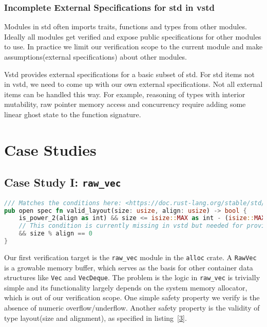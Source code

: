 \documentclass[conference]{IEEEtran}
\begin{document}
\subsubsection{Incomplete External Specifications for std in vstd}
Modules in std often imports traits, functions and types from other modules. Ideally all modules get verified and expose public specifications for other modules to use. In practice we limit our verification scope to the current module and make assumptions(external specifications) about other modules. 

Vstd provides external specifications for a basic subset of std. For std items not in vstd, we need to come up with our own external specifications. Not all external items can be handled this way. For example, reasoning of types with interior mutability, raw pointer memory access and concurrency require adding some linear ghost state to the function signature.   

\section{Case Studies}
\subsection{Case Study I: \texttt{raw\_vec}}
\begin{lstlisting}[language=Rust,style=colouredRust, caption={The formal specification of a valid layout in vstd}, label = {3}]
/// Matches the conditions here: <https://doc.rust-lang.org/stable/std/alloc/struct.Layout.html>
pub open spec fn valid_layout(size: usize, align: usize) -> bool {
    is_power_2(align as int) && size <= isize::MAX as int - (isize::MAX as int % align as int)
    // This condition is currently missing in vstd but needed for proving pointer arithmics. See <https://github.com/verus-lang/verus/issues/1570>.
    && size % align == 0 
}
\end{lstlisting}
Our first verification target is the \texttt{raw\_vec} module in the \texttt{alloc} crate. A \texttt{RawVec} is a growable memory buffer, which serves as the basis for other container data structures like \texttt{Vec} and \texttt{VecDeque}. The problem is the logic in \texttt{raw\_vec} is trivially simple and its functionality largely depends on the system memory allocator, which is out of our verification scope. One simple safety property we verify is the absence of numeric overflow/underflow. Another safety property is the validity of type layout(size and alignment), as specified in listing~\ref{3}. 
\end{document}
